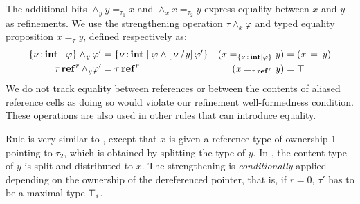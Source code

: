 The additional bits $\land_y  \mathit{y}  =_{ \tau_{{\mathrm{1}}} }  \mathit{x} $ and $\land_x  \mathit{x}  =_{ \tau_{{\mathrm{2}}} }  \mathit{y} $
express equality between $\mathit{x}$ and $\mathit{y}$ as refinements.  We use
the strengthening operation $ \tau  \wedge_{ \mathit{x} }  \varphi $ and typed equality
proposition $ \mathit{x}  =_{ \tau }  \mathit{y} $, defined respectively as:
\begin{align*}
    \left\{{  \nu  \operatorname{:} \mathbf{int} \mid  \varphi }\right\}   \wedge_{ \mathit{y} }  \varphi'  & =  \left\{{  \nu  \operatorname{:} \mathbf{int} \mid   \varphi  \wedge  [ \, \nu \, /  \mathit{y}  ] \, \varphi'  }\right\}  &
  (   \mathit{x}  =_{  \left\{{  \nu  \operatorname{:} \mathbf{int} \mid  \varphi }\right\}  }  \mathit{y}   ) & =  (  \mathit{x} \, = \, \mathit{y}  ) \\ 
      \tau  \operatorname{\mathbf{ref}}^{ r }   \wedge_{ \mathit{y} }  \varphi'  & =  \tau  \operatorname{\mathbf{ref}}^{ r }  &
    (   \mathit{x}  =_{  \tau  \operatorname{\mathbf{ref}}^{ r }  }  \mathit{y}   ) & =  \top 
\end{align*}
We do not track equality between references or between the contents of aliased
reference cells as doing so would violate our refinement
well-formedness condition.  These operations are also used in other rules
that can introduce equality.

Rule  is very similar to , except that $\mathit{x}$
is given a reference type of ownership 1 pointing to $\tau_{{\mathrm{2}}}$, which
is obtained by splitting the type of $\mathit{y}$.  In ,
the content type of $\mathit{y}$ is split and distributed to
$\mathit{x}$.  The strengthening is \emph{conditionally} applied depending
on the ownership of the dereferenced pointer, that is, if $r = 0$,
$\tau'$ has to be a maximal type $\top_{\mathit{i}}$.



